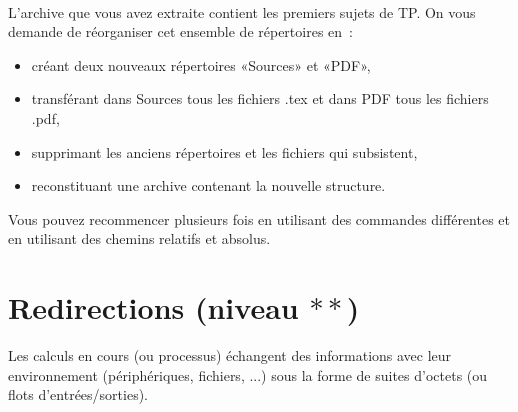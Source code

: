 \documentclass[a4paper,11pt]{article}
\begin{document}
\

\begin{maw}

L'archive que vous avez extraite contient les premiers sujets de
TP. On vous demande de réorganiser cet ensemble de répertoires en :

\begin{itemize}
  \item créant deux nouveaux répertoires «Sources» et «PDF»,
  \item transférant dans Sources tous les fichiers .tex et dans PDF tous
        les fichiers .pdf,
  \item supprimant les anciens répertoires et les fichiers qui subsistent,
  \item reconstituant une archive contenant la nouvelle structure.
\end{itemize}

Vous pouvez recommencer plusieurs fois en utilisant des commandes
différentes et en utilisant des chemins relatifs et absolus.
\end{maw}

\section{Redirections (niveau $**$)}

Les calculs en cours (ou processus) échangent des informations avec leur
environnement (périphériques, fichiers, ...) sous la forme de suites d'octets
(ou flots d'entrées/sorties).
\end{document}

